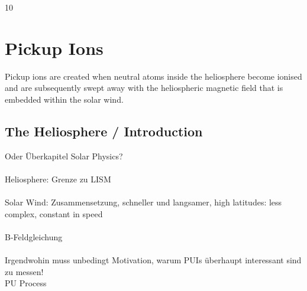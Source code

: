 10%

\chapter{Pickup Ions} %

\label{Chapter1} %





Pickup ions are created when neutral atoms inside the heliosphere become ionised and are subsequently swept away with the heliospheric magnetic field that is embedded within the solar wind.


\section{The Heliosphere / Introduction}

Oder Überkapitel Solar Physics?
\\ \\
Heliosphere: Grenze zu LISM
\\ \\
Solar Wind: Zusammensetzung, schneller und langsamer, high latitudes: less complex, constant in speed \\ \\
B-Feldgleichung
\\ \\
Irgendwohin muss unbedingt Motivation, warum PUIs überhaupt interessant sind zu messen!
\\
PU Process

